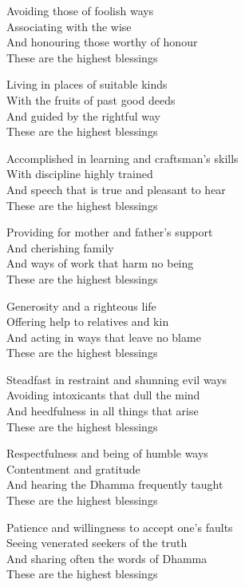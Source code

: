 \bigskip

Avoiding those of foolish ways\\
Associating with the wise\\
And honouring those worthy of honour\\
These are the highest blessings

\bigskip

Living in places of suitable kinds\\
With the fruits of past good deeds\\
And guided by the rightful way\\
These are the highest blessings

\bigskip

Accomplished in learning and craftsman’s skills\\
With discipline highly trained\\
And speech that is true and pleasant to hear\\
These are the highest blessings

\bigskip

Providing for mother and father’s support\\
And cherishing family\\
And ways of work that harm no being\\
These are the highest blessings

\bigskip

Generosity and a righteous life\\
Offering help to relatives and kin\\
And acting in ways that leave no blame\\
These are the highest blessings

\bigskip

Steadfast in restraint and shunning evil ways\\
Avoiding intoxicants that dull the mind\\
And heedfulness in all things that arise\\
These are the highest blessings

\bigskip

Respectfulness and being of humble ways\\
Contentment and gratitude\\
And hearing the Dhamma frequently taught\\
These are the highest blessings

\bigskip

Patience and willingness to accept one’s faults\\
Seeing venerated seekers of the truth\\
And sharing often the words of Dhamma\\
These are the highest blessings

